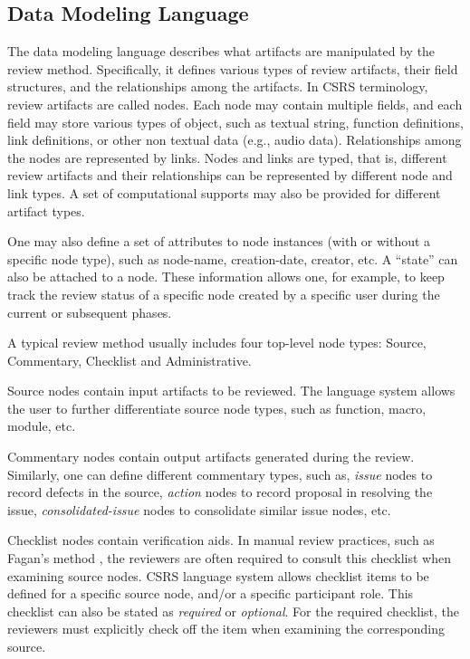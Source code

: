 \subsection{Data Modeling Language}

The data modeling language describes what artifacts are manipulated by
the review method. Specifically, it defines various types of review
artifacts, their field structures, and the relationships among the
artifacts. In CSRS terminology, review artifacts are called nodes.
Each node may contain multiple fields, and each field may store
various types of object, such as 
textual string, function definitions, link definitions, or other non
textual data (e.g., audio data). Relationships among the nodes are
represented by links.   
Nodes and links are typed, that is, different review artifacts and
their relationships can be represented by different node and link types. 
A set of computational supports may also be provided for different
artifact types.

One may also define a set of attributes to node instances (with or
without a specific node type), such as node-name, creation-date,
creator, etc. A ``state'' can also be attached to a node. These
information allows one, for example, to keep track the review
status of a specific node created by a specific user during the
current or subsequent phases. 

A typical review method usually includes four top-level node
types: Source, Commentary, Checklist and Administrative.

Source nodes contain input artifacts to be reviewed. The language
system allows the user to further differentiate source node types,
such as function, macro, module, etc. 

Commentary nodes contain output artifacts generated during the
review. Similarly, one can define different commentary types,
such as, {\it issue} nodes to record defects in the source,
{\it action} nodes to record proposal in resolving the issue, 
{\it consolidated-issue} nodes to consolidate similar issue nodes, etc.

Checklist nodes contain verification aids. In manual review practices,
such as Fagan's method \cite{Fagan76}, the reviewers are often required
to consult this checklist when examining source nodes. CSRS language
system allows checklist items to be defined for a specific source
node, and/or a specific participant role.
This checklist can also be stated as {\it required} or {\it optional}. 
For the required checklist, the reviewers
must explicitly check off the item when examining the corresponding source.

